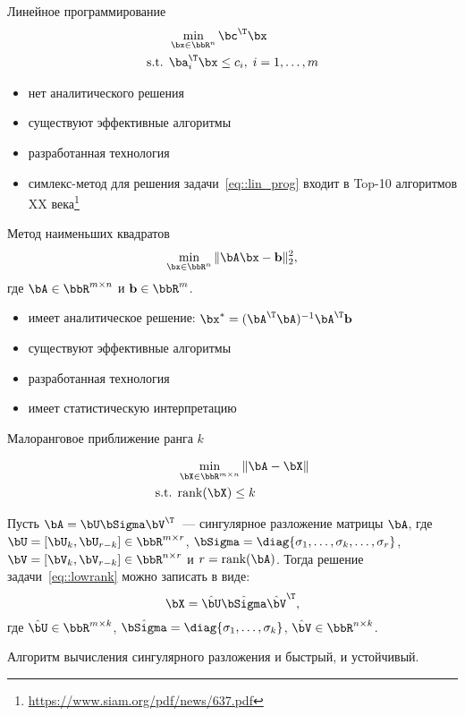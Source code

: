 \documentclass[12pt]{beamer}
\begin{document}
\begin{frame}{Линейное программирование}
\begin{equation}
\begin{split}
&\min\limits_{\bx \in \bbR^n} \bc^{\T}\bx\\
\text{s.t. } & \ba^{\T}_i \bx \leq c_i, \; i = 1,\ldots, m
\end{split}
\label{eq::lin_prog}
\end{equation}
\begin{itemize}
\item нет аналитического решения
\item существуют эффективные алгоритмы
\item разработанная технология
\item симлекс-метод для решения задачи~\eqref{eq::lin_prog} входит в Top-10 алгоритмов XX века\footnote{\url{https://www.siam.org/pdf/news/637.pdf}}
\end{itemize}
\end{frame}

\begin{frame}{Метод наименьших квадратов}
\begin{equation}
\min\limits_{\bx \in \bbR^n} \|\bA\bx - \mathbf{b} \|^2_2,
\label{eq::least_sq}
\end{equation}
где $\bA \in \bbR^{m \times n}$ и $\mathbf{b} \in \bbR^m$.
\begin{itemize}
\item имеет аналитическое решение: $\bx^* = (\bA^{\T}\bA)^{-1}\bA^{\T}\mathbf{b}$
\item существуют эффективные алгоритмы
\item разработанная технология
\item имеет статистическую интерпретацию
\end{itemize}
\end{frame}

\begin{frame}{Малоранговое приближение ранга $k$}

\begin{equation}
\begin{split}
&\min\limits_{\bX \in \bbR^{m \times n}} \|\bA - \bX \| \\
\text{s.t. } & \text{rank}(\bX) \leq k
\end{split}
\label{eq::lowrank}
\end{equation}

\begin{Theorem}
Пусть $\bA = \bU\bSigma\bV^{\T}$~--- сингулярное разложение матрицы $\bA$, где $\bU = [\bU_k, \bU_{r-k}] \in \bbR^{m \times r}$, $\bSigma = \diag{\sigma_1, \ldots, \sigma_k, \ldots, \sigma_r}$, $\bV = [\bV_k, \bV_{r - k}] \in \bbR^{n \times r}$ и $r = \text{rank}(\bA)$.  Тогда решение задачи~\eqref{eq::lowrank} можно записать в виде:
\[
\bX = \hat{\bU} \hat{\bSigma} \hat{\bV}^{\T},
\]
где $\hat{\bU} \in \bbR^{m \times k}$, $\hat{\bSigma} = \diag{\sigma_1, \ldots, \sigma_k}$, $\hat{\bV} \in \bbR^{n \times k}$.
\end{Theorem}
\small Алгоритм вычисления сингулярного разложения и быстрый, и устойчивый.
\end{frame}
\end{document}
